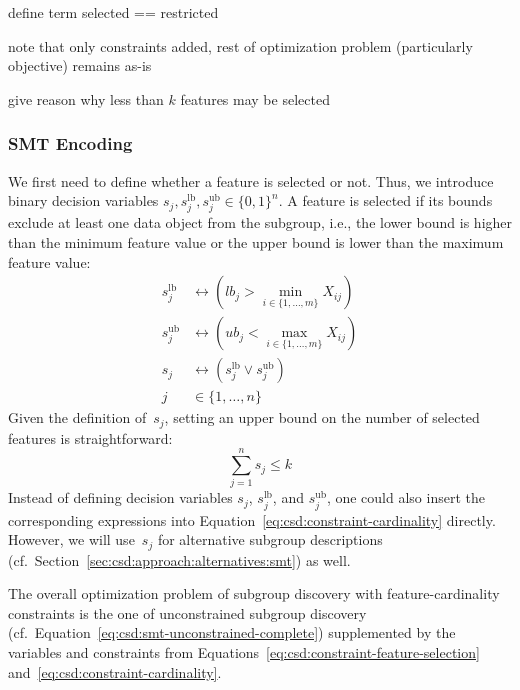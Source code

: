 \documentclass{article}
\theoremstyle{definition}
\begin{document}
define term selected == restricted

note that only constraints added, rest of optimization problem (particularly objective) remains as-is

give reason why less than $k$ features may be selected

\subsubsection{SMT Encoding}
\label{sec:csd:approach:cardinality:smt}

We first need to define whether a feature is selected or not.
Thus, we introduce binary decision variables $s_j, s_j^{\text{lb}}, s_j^{\text{ub}} \in \{0, 1\}^n$.
A feature is selected if its bounds exclude at least one data object from the subgroup, i.e., the lower bound is higher than the minimum feature value or the upper bound is lower than the maximum feature value:
%
\begin{equation}
	\begin{aligned}
		s_j^{\text{lb}} &\leftrightarrow \left( \textit{lb}_j > \min_{i \in \{1, \dots, m\}} X_{ij} \right) \\
		s_j^{\text{ub}} &\leftrightarrow \left( \textit{ub}_j < \max_{i \in \{1, \dots, m\}} X_{ij} \right) \\
		s_j &\leftrightarrow \left( s_j^{\text{lb}} \lor s_j^{\text{ub}} \right) \\
		j &\in \{1, \dots, n\}
	\end{aligned}
	\label{eq:csd:constraint-feature-selection}
\end{equation}
%
Given the definition of~$s_j$, setting an upper bound on the number of selected features is straightforward:
%
\begin{equation}
	\sum_{j=1}^n s_j \leq k
	\label{eq:csd:constraint-cardinality}
\end{equation}
%
Instead of defining decision variables $s_j$, $s_j^{\text{lb}}$, and $s_j^{\text{ub}}$, one could also insert the corresponding expressions into Equation~\ref{eq:csd:constraint-cardinality} directly.
However, we will use~$s_j$ for alternative subgroup descriptions (cf.~Section~\ref{sec:csd:approach:alternatives:smt}) as well.

The overall optimization problem of subgroup discovery with feature-cardinality constraints is the one of unconstrained subgroup discovery (cf.~Equation~\ref{eq:csd:smt-unconstrained-complete}) supplemented by the variables and constraints from Equations~\ref{eq:csd:constraint-feature-selection} and~\ref{eq:csd:constraint-cardinality}.
\end{document}
